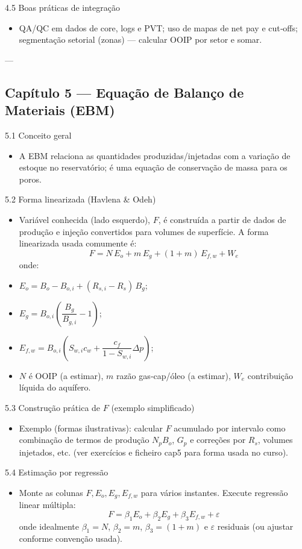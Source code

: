\documentclass[11pt,a4paper]{article}
\begin{document}
4.5 Boas práticas de integração
\begin{itemize}
\item QA/QC em dados de core, logs e PVT; uso de mapas de net pay e cut‑offs; segmentação setorial (zonas) — calcular OOIP por setor e somar.
\end{itemize}

---

\subsection{Capítulo 5 — Equação de Balanço de Materiais (EBM)}

5.1 Conceito geral
\begin{itemize}
\item A EBM relaciona as quantidades produzidas/injetadas com a variação de estoque no reservatório; é uma equação de conservação de massa para os poros.
\end{itemize}

5.2 Forma linearizada (Havlena \& Odeh)
\begin{itemize}
\item Variável conhecida (lado esquerdo), $F$, é construída a partir de dados de produção e injeção convertidos para volumes de superfície. A forma linearizada usada comumente é:
$$F = N\,E_o + m\,E_g + (1+m)\,E_{f,w} + W_e$$
onde:
\item $E_o = B_o - B_{o,i} + (R_{s,i}-R_s)\,B_g$;
\item $E_g = B_{o,i}\left(\dfrac{B_g}{B_{g,i}} - 1\right)$;
\item $E_{f,w} = B_{o,i}\left(S_{w,i}c_w + \dfrac{c_f}{1-S_{w,i}}\Delta p\right)$;
\item $N$ é OOIP (a estimar), $m$ razão gas‑cap/óleo (a estimar), $W_e$ contribuição líquida do aquífero.
\end{itemize}

5.3 Construção prática de $F$ (exemplo simplificado)
\begin{itemize}
\item Exemplo (formas ilustrativas): calcular $F$ acumulado por intervalo como combinação de termos de produção $N_p B_o$, $G_p$ e correções por $R_s$, volumes injetados, etc. (ver exercícios e ficheiro cap5 para forma usada no curso).
\end{itemize}

5.4 Estimação por regressão
\begin{itemize}
\item Monte as colunas $F, E_o, E_g, E_{f,w}$ para vários instantes. Execute regressão linear múltipla:
$$F = \beta_1 E_o + \beta_2 E_g + \beta_3 E_{f,w} + \varepsilon$$
onde idealmente $\beta_1=N$, $\beta_2=m$, $\beta_3=(1+m)$ e $\varepsilon$ residuais (ou ajustar conforme convenção usada).
\end{itemize}
\end{document}
